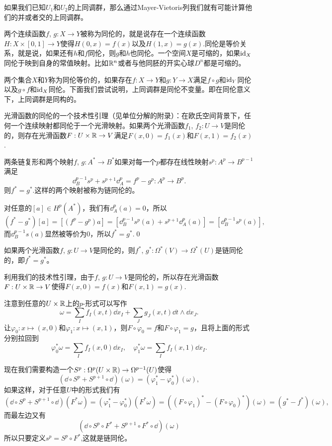如果我们已知$U_1$和$U_2$的上同调群，那么通过Mayer-Vietoris列我们就有可能计算他们的并或者交的上同调群。

\para 两个连续函数$f$, $g:X\to Y$被称为同伦的，就是说存在一个连续函数$H:X\times [0,1]\to Y$使得$H(0,x)=f(x)$以及$H(1,x)=g(x)$.同伦是等价关系，就是说，如果还有$h$和$f$同伦，则$g$和$h$也同伦。一个空间$X$是可缩的，如果$\operatorname{id}_X$同伦于映到自身的常值映射。比如$\mathbb{R}^n$或者与他同胚的开实心球$D^n$都是可缩的。

两个集合$X$和$Y$称为同伦等价的，如果存在$f:X\to Y$和$g:Y\to X$满足$f\circ g$和$\operatorname{id}_Y$同伦以及$g\circ f$和$\operatorname{id}_X$同伦。下面我们尝试说明，上同调群是同伦不变量。即在同伦意义下，上同调群是同构的。

\lem 光滑函数的同伦的一个技术性引理（见单位分解的附录）：在欧氏空间背景下，任何一个连续映射都同伦于一个光滑映射。如果两个光滑函数$f_1$, $f_2:U\to V$是同伦的，则存在光滑函数$F:U\times \mathbb{R}\to V$满足$F(x,0)=f_1(x)$和$F(x,1)=f_2(x)$.

\pro 两条链复形和两个映射$f$, $g:A^*\to B^*$如果对每一个$p$都存在线性映射$s^p:A^p \to B^{p-1}$满足
\[
\dd_B^{p-1}s^p+s^{p+1}\dd_A^p=f^p-g^p:A^p\to B^p.
\]
则$f^*=g^*$.这样的两个映射被称为链同伦的。

\proof 对任意的$[a]\in H^p(A^*)$，我们有$\dd_A^p(a)=0$，所以
\[
(f^*-g^*)[a]=[(f^p-g^p)a]=[\dd^{p-1}_Bs^p(a)+s^{p+1}\dd_A^p(a)]=[\dd^{p-1}_Bs^p(a)],
\]
而$\dd^{p-1}_Bs(a)$显然被等价为0，所以$f^*=g^*$.\qed

\pro 如果两个光滑函数$f$, $g:U\to V$是同伦的，则$
f^*$, $g^*:\Omega^*(V)\to \Omega^*(U)$是链同伦的，即$f^*=g^*$。

\proof 利用我们的技术性引理，由于$f$, $g:U\to V$是同伦的，所以存在光滑函数$F:U\times \mathbb{R} \to V$使得$F(x,0)=f(x)$和$F(x,1)=g(x)$.

注意到任意的$U\times \mathbb{R}$上的$p$-形式可以写作
\[
\omega=\sum_If_I(x,t)\dd x_I+\sum_J g_J(x,t)\dd t\wedge \dd x_J.
\]
让$\varphi_0:x\mapsto (x,0)$和$\varphi_1:x\mapsto (x,1)$，则$F\circ \varphi_0=f$和$F\circ \varphi_1=g$，且将上面的形式分别拉回到
\[
\varphi_0^*\omega=\sum_I f_I(x,0)\dd x_I,\quad
\varphi_1^*\omega=\sum_I f_I(x,1)\dd x_I.
\]

现在我们需要构造一个$S^p:\Omega^p(U\times \mathbb{R})\to \Omega^{p-1}(U)$使得
\[
(\dd \circ S^p+S^{p+1}\circ \dd)(\omega)=(\varphi_1^*-\varphi_0^*)(\omega),
\]
如果这样，对于任意$U$中的形式我们有
\[
(\dd \circ S^p+S^{p+1}\circ \dd)(F^*\omega)=(\varphi_1^*-\varphi_0^*)(F^*\omega)=((F\circ \varphi_1)^*-(F\circ \varphi_0)^*)(\omega)=(g^*-f^*)(\omega),
\]
而最左边又有
\[
(\dd \circ S^p\circ F^*+S^{p+1}\circ F^* \circ \dd)(\omega)
\]
所以只要定义$s^p=S^p\circ F^*$,这就是链同伦。


